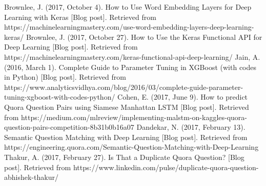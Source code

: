 \documentclass[letterpaper, 10 pt, conference]{ieeeconf}  %
\begin{document}
\begin{thebibliography}{99}
 Brownlee, J. (2017, October 4). How to Use Word Embedding Layers for Deep Learning with Keras [Blog post]. Retrieved from https://machinelearningmastery.com/use-word-embedding-layers-deep-learning-keras/
 Brownlee, J. (2017, October 27). How to Use the Keras Functional API for Deep Learning [Blog post]. Retrieved from https://machinelearningmastery.com/keras-functional-api-deep-learning/
 Jain, A. (2016, March 1). Complete Guide to Parameter Tuning in XGBoost (with codes in Python) [Blog post]. Retrieved from https://www.analyticsvidhya.com/blog/2016/03/complete-guide-parameter-tuning-xgboost-with-codes-python/
 Cohen, E. (2017, June 9). How to predict Quora Question Pairs using Siamese Manhattan LSTM [Blog post]. Retrieved from https://medium.com/mlreview/implementing-malstm-on-kaggles-quora-question-pairs-competition-8b31b0b16a07
 Dandekar, N. (2017, February 13). Semantic Question Matching with Deep Learning [Blog post]. Retrieved from https://engineering.quora.com/Semantic-Question-Matching-with-Deep-Learning
 Thakur, A. (2017, February 27). Is That a Duplicate Quora Question? [Blog post]. Retrieved from https://www.linkedin.com/pulse/duplicate-quora-question-abhishek-thakur/

\end{thebibliography}
\end{document}

